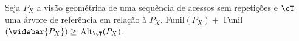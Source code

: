 \begin{comment}
\begin{lemma}
    Seja $p$ um ponto de um conjunto $P$. Se $p \in P_E$ então $f(P,p) \geq f(P_E,p)$ e $f(\widebar{P},\widebar{p}) \geq f(\widebar{P_E},\widebar{p})$. Se $p \in P_D$ então $f(P,p) \geq f(P_D,p)$ e $f(\widebar{P},\widebar{p}) \geq f(\widebar{P_D},\widebar{p})$.
\end{lemma}

\begin{proof}
    Suponha que $p \in P_E$. Como $p$ pertence a $P_E$ 
    Perceba que todos os pontos do funil esquerdo de $p$  
    
    Todos os pontos à esquerda de $p$ também pertencem a $P_E$, ou seja, $F_E(P_E,p) = F_E(P,p)$.
\end{proof}
\end{comment}

\begin{lemma} \label{lemma-relacao-alt-com-funil}
    Seja $P_X$ a visão geométrica de uma sequência de acessos sem repetições e $\cT$ uma árvore de referência em relação à $P_X$. Funil$(P_X) + $ Funil$(\widebar{P_X}) \geq $ Alt$_{\cT}(P_X)$.
\end{lemma}

